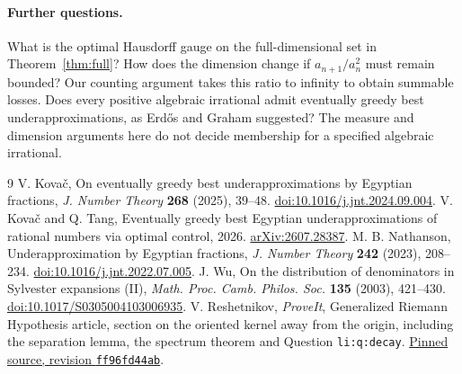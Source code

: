 \documentclass[11pt]{article}
\begin{document}
\paragraph{Further questions.} What is the optimal Hausdorff gauge on the full-dimensional set in Theorem~\ref{thm:full}? How does the dimension change if $a_{n+1}/a_n^2$ must remain bounded? Our counting argument takes this ratio to infinity to obtain summable losses. Does every positive algebraic irrational admit eventually greedy best underapproximations, as Erd\H os and Graham suggested? The measure and dimension arguments here do not decide membership for a specified algebraic irrational.

\begin{thebibliography}{9}
 V. Kova\v c, On eventually greedy best underapproximations by Egyptian fractions, \emph{J. Number Theory} \textbf{268} (2025), 39--48. \href{https://doi.org/10.1016/j.jnt.2024.09.004}{doi:10.1016/j.jnt.2024.09.004}.
 V. Kova\v c and Q. Tang, Eventually greedy best Egyptian underapproximations of rational numbers via optimal control, 2026. \href{https://arxiv.org/abs/2607.28387}{arXiv:2607.28387}.
 M. B. Nathanson, Underapproximation by Egyptian fractions, \emph{J. Number Theory} \textbf{242} (2023), 208--234. \href{https://doi.org/10.1016/j.jnt.2022.07.005}{doi:10.1016/j.jnt.2022.07.005}.
 J. Wu, On the distribution of denominators in Sylvester expansions (II), \emph{Math. Proc. Camb. Philos. Soc.} \textbf{135} (2003), 421--430. \href{https://doi.org/10.1017/S0305004103006935}{doi:10.1017/S0305004103006935}.
 V. Reshetnikov, \emph{ProveIt}, Generalized Riemann Hypothesis article, section on the oriented kernel away from the origin, including the separation lemma, the spectrum theorem and Question \texttt{li:q:decay}. \href{https://github.com/VladimirReshetnikov/ProveIt/blob/ff96fd44ab160e65fb8a9d861243828d07c156cf/Analysis/GeneralizedRiemannHypothesis/Article/sections/li.tex}{Pinned source, revision \texttt{ff96fd44ab}}.
\end{thebibliography}
\end{document}
